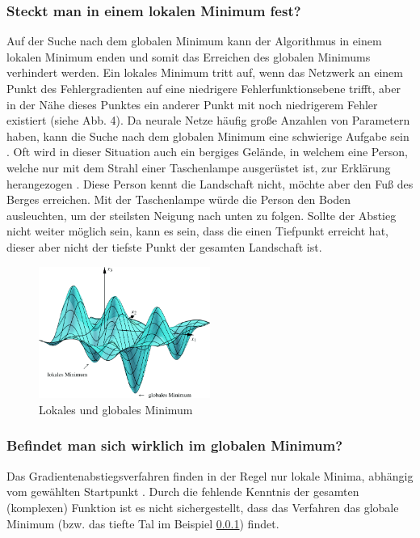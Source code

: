 \subsubsection{Steckt man in einem lokalen Minimum fest?}\label{subsec:gradientenverfahren:fehlerquellen_lokalen_minimum}
  Auf der Suche nach dem globalen Minimum kann der Algorithmus in einem lokalen Minimum enden und somit das Erreichen des globalen Minimums verhindert werden.
  Ein lokales Minimum tritt auf, wenn das Netzwerk an einem Punkt des Fehlergradienten auf eine niedrigere Fehlerfunktionsebene trifft, aber in der Nähe dieses Punktes ein anderer Punkt mit noch niedrigerem Fehler existiert (siehe Abb. 4).
  Da neurale Netze häufig große Anzahlen von Parametern haben, kann die Suche nach dem globalen Minimum eine schwierige Aufgabe sein \cite{HS97}.
  Oft wird in dieser Situation auch ein bergiges Gelände, in welchem eine Person, welche nur mit dem Strahl einer Taschenlampe ausgerüstet ist, zur Erklärung herangezogen \cite{TR17}.
  Diese Person kennt die Landschaft nicht, möchte aber den Fuß des Berges erreichen. Mit der Taschenlampe würde die Person den Boden ausleuchten, um der steilsten Neigung nach unten zu folgen.
  Sollte der Abstieg nicht weiter möglich sein, kann es sein, dass die einen Tiefpunkt erreicht hat, dieser aber nicht der tiefste Punkt der gesamten Landschaft ist.
  \\
  \begin{figure}[ht]
    \centering
    \includegraphics[width=0.5\textwidth]{Sources/03-3.3.2_3-dimensionaler_abstieg.png}
    \caption{Lokales und globales Minimum}
    \label{subsec:lokale-globale-minima}
\end{figure}

\subsubsection{Befindet man sich wirklich im globalen Minimum?}\label{subsec:gradientenverfahren:fehlerquellen_globalen_minimum}
  Das Gradientenabstiegsverfahren finden in der Regel nur lokale Minima, abhängig vom gewählten Startpunkt \cite{HS97}.
  Durch die fehlende Kenntnis der gesamten (komplexen) Funktion ist es nicht sichergestellt, dass das Verfahren das globale Minimum (bzw. das tiefte Tal im Beispiel \ref*{subsec:gradientenverfahren:fehlerquellen_lokalen_minimum}) findet.

